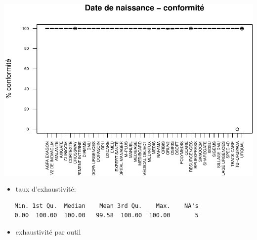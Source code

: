 \documentclass[]{article}
\providecommand{\tightlist}{%
  \setlength{\itemsep}{0pt}\setlength{\parskip}{0pt}}
\begin{document}
\includegraphics{septembre2015_files/figure-latex/unnamed-chunk-14-1.pdf}

\begin{itemize}
\tightlist
\item
  taux d'exhaustivité:
\end{itemize}

\begin{verbatim}
   Min. 1st Qu.  Median    Mean 3rd Qu.    Max.    NA's 
   0.00  100.00  100.00   99.58  100.00  100.00       5 
\end{verbatim}

\begin{itemize}
\tightlist
\item
  exhaustivité par outil
\end{itemize}
\end{document}
